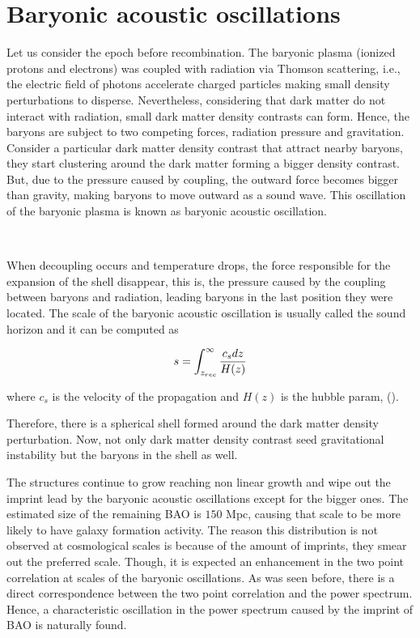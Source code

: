 \section{ Baryonic acoustic oscillations }

Let us consider the epoch before recombination. The baryonic plasma (ionized protons and electrons) was coupled with radiation via 
Thomson scattering,  i.e., the electric field of photons accelerate charged particles making small density perturbations to disperse. Nevertheless,
considering that dark matter do not interact with radiation, small dark matter density contrasts can form. Hence, the baryons are 
subject to two competing forces, radiation pressure and gravitation. Consider a particular dark matter density contrast that attract
nearby baryons, they start clustering around the dark matter forming a bigger density contrast. But, due to the pressure caused
by coupling, the outward force becomes bigger than gravity, making baryons to move outward as a sound wave. This oscillation 
of the baryonic plasma is known as baryonic acoustic oscillation. 

\

When decoupling occurs and temperature drops, the force responsible for the expansion of the shell disappear, this is, 
the pressure caused by the coupling between baryons and radiation, leading baryons in the last position they were located. 
The scale of the baryonic acoustic oscillation is 
usually called the sound horizon and it can be computed as

\[  
s = \int_{z_{rec}}^{\infty} \frac{c_s dz}{H(z)}
\]


where $c_s$ is the velocity of the propagation and $H(z)$ is the hubble param, (\cite{pilar}). 

Therefore, there is a spherical shell formed 
around the dark matter density perturbation. Now, not only dark matter density contrast seed gravitational instability but the baryons in the shell as well. 

The structures continue to grow reaching non linear growth and wipe out the imprint lead by the baryonic acoustic oscillations except for the bigger ones. The estimated size of the remaining BAO is $150$ Mpc, causing that scale to 
be more likely to have galaxy formation activity. The reason this distribution is not observed at cosmological scales is because
of the amount of imprints, they smear out the preferred scale. Though, it is expected an enhancement in the two point
correlation at scales of the baryonic oscillations. As was seen before, there is a direct correspondence between the 
two point correlation and the power spectrum. Hence, a characteristic oscillation in the power spectrum caused by the imprint of BAO is naturally found. 	

